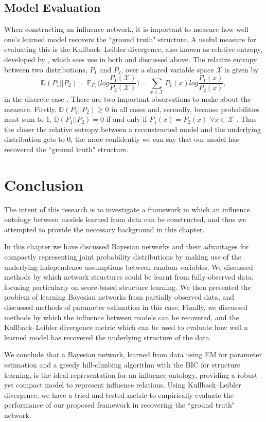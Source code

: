 \documentclass [11pt]{article}
\begin{document}
\subsection{Model Evaluation}\label{ModelEvaluation}
When constructing an influence network, it is important to measure how well one's learned model recovers the ``ground truth" structure. A useful measure for evaluating this is the Kullback–Leibler divergence, also known as relative entropy, developed by \cite{kullback1951}, which sees use in both \cite{ajoodha17} and \cite{ajoodha18} discussed above. The relative entropy between two distributions, $P_{1}$ and $P_{2}$, over a shared variable space $\mathcal{X}$ is given by
\begin{equation*}
\mathbb{D}(P_{1}||P_{2}) = \mathbb{E}_{P_{1}}\Bigg(log\frac{P_{1}(\mathcal{X})}{P_{2}(\mathcal{X})}\Bigg) = \sum_{x\in\mathcal{X}}P_{1}(x)log\frac{P_{1}(x)}{P_{2}(x)},
\end{equation*}
in the discrete case \citep{koller09}. There are two important observations to make about the measure. Firstly, $\mathbb{D}(P_{1}||P_{2}) \geq 0$ in all cases and, secondly, because probabilities must sum to $1$, $\mathbb{D}(P_{1}||P_{2}) = 0$ if and only if $P_{1}(x) = P_{2}(x)$ $\forall x\in\mathcal{X}$ \citep{koller09}. Thus the closer the relative entropy between a reconstructed model and the underlying distribution gets to $0$, the more confidently we can say that our model has recovered the ``ground truth" structure.
\section{Conclusion}
The intent of this research is to investigate a framework in which an influence ontology between models learned from data can be constructed, and thus we attempted to provide the necessary background in this chapter.

In this chapter we have discussed Bayesian networks and their advantages for compactly representing joint probability distributions by making use of the underlying independence assumptions between random variables. We discussed methods by which network structures could be learnt from fully-observed data, focusing particularly on score-based structure learning. We then presented the problem of learning Bayesian networks from partially observed data, and discussed methods of parameter estimation in this case. Finally, we discussed methods by which the influence between models can be recovered, and the Kullback–Leibler divergence metric which can be used to evaluate how well a learned model has recovered the underlying structure of the data.

We conclude that a Bayesian network, learned from data using EM for parameter estimation and a greedy hill-climbing algorithm with the BIC for structure learning, is the ideal representation for an influence ontology, providing a robust yet compact model to represent influence relations. Using Kullback–Leibler divergence, we have a tried and tested metric to empirically evaluate the performance of our proposed framework in recovering the ``ground truth" network.


\end{document}
